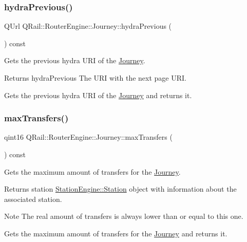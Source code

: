 \subsubsection{\texorpdfstring{hydraPrevious()}{hydraPrevious()}}
{\footnotesize\ttfamily Q\+Url Q\+Rail\+::\+Router\+Engine\+::\+Journey\+::hydra\+Previous (\begin{DoxyParamCaption}{ }\end{DoxyParamCaption}) const}



Gets the previous hydra U\+RI of the \mbox{\hyperlink{classQRail_1_1RouterEngine_1_1Journey}{Journey}}. 

\begin{DoxyReturn}{Returns}
hydra\+Previous The U\+RI with the next page U\+RI.
\end{DoxyReturn}
Gets the previous hydra U\+RI of the \mbox{\hyperlink{classQRail_1_1RouterEngine_1_1Journey}{Journey}} and returns it. \mbox{\label{classQRail_1_1RouterEngine_1_1Journey_aa32ea56927a1727c3ab17b6ae584bbed}} 
\subsubsection{\texorpdfstring{maxTransfers()}{maxTransfers()}}
{\footnotesize\ttfamily qint16 Q\+Rail\+::\+Router\+Engine\+::\+Journey\+::max\+Transfers (\begin{DoxyParamCaption}{ }\end{DoxyParamCaption}) const}



Gets the maximum amount of transfers for the \mbox{\hyperlink{classQRail_1_1RouterEngine_1_1Journey}{Journey}}. 

\begin{DoxyReturn}{Returns}
station \mbox{\hyperlink{classQRail_1_1StationEngine_1_1Station}{Station\+Engine\+::\+Station}} object with information about the associated station. 
\end{DoxyReturn}
\begin{DoxyNote}{Note}
The real amount of transfers is always lower than or equal to this one.
\end{DoxyNote}
Gets the maximum amount of transfers for the \mbox{\hyperlink{classQRail_1_1RouterEngine_1_1Journey}{Journey}} and returns it. \mbox{\label{classQRail_1_1RouterEngine_1_1Journey_ac1ead02119493cf91dc47f867034108e}} 

